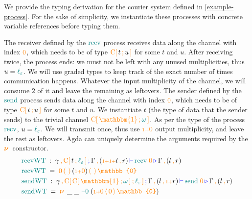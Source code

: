 \documentclass[runningheads]{llncs}
\newcommand{\type}[1]{\textcolor{blue}{\operatorname{#1}}}
\newcommand{\constr}[1]{\textcolor{orange}{\operatorname{#1}}}
\newcommand{\func}[1]{\textcolor{teal}{\operatorname{#1}}}
\newcommand{\PO}{\constr{\mathbb{0}}}
\newcommand{\new}{\constr{\boldsymbol{\nu}} \,}
\newcommand{\send}[2]{#1 \, \constr{\langle} \, #2 \,\constr{\rangle} \,}
\newcommand{\recv}[2]{#1 \, \constr{\mathbb{(}} \, #2 \, \constr{\mathbb{)}} \,}
\newcommand{\suc}{\constr{\scriptstyle 1+}}
\newcommand{\unit}{\constr{\mathbbm{1}}}
\newcommand{\channel}[2]{\constr{C[} \, #1 \, \constr{;} \, #2 \, \constr{]}}
\newcommand{\comma}{\, \constr{,} \,}
\newcommand{\zero}{\func{\cdot-0}}
\newcommand{\lz}{\func{\ell_{\varepsilon}}}
\newcommand{\types}[4]{#1 \, \type{;} \, #2 \, \type{\vdash} \, #3 \, \type{\triangleright} \, #4}
\begin{document}
\begin{example}
\label{example-derivation}
We provide the typing derivation for the courier system defined in \autoref{example-process}.
For the sake of simplicity, we instantiate these processes with concrete variable references before typing them.

The receiver defined by the $\func{recv}$ process receives data along the channel with index $\constr{0}$, which needs to be of type $\channel{t}{u}$ for some $t$ and $u$.
After receiving twice, the process ends: we must not be left with any unused multiplicities, thus $u = \lz$.
We will use graded types to keep track of the exact number of times communication happens.
Whatever the input multiplicity of the channel, we will consume $2$ of it and leave the remaining as leftovers.
The sender defined by the $\func{send}$ process sends data along the channel with index $\constr{0}$, which needs to be of type $\channel{t}{u}$ for some $t$ and $u$.
We instantiate $t$ (the type of data that the sender sends) to the trivial channel $\channel{\unit}{\func{\omega}}$.
As per the type of the process $\func{recv}$, $u = \lz$.
We will transmit once, thus use $\suc{\constr{0}}$ output multiplicity, and leave the rest as leftovers.
Agda can uniquely determine the arguments required by the $\new{}$ constructor.
\begin{align*}
   & \func{recvWT} \;  : \; \types{\gamma \comma \channel{t}{\lz}  }{\Gamma \comma (\suc \suc l \comma r)  }{\func{recv} \; \constr{0}  }{\Gamma \comma (l \comma r)} \\
   & \func{recvWT} \;  = \; \recv{\constr{0}}{} \recv{(\suc \constr{0})}{} \PO \\
   & \func{sendWT} \;  : \; \types{\gamma \comma \channel{\channel{\unit}{\func{\omega}}}{\lz}  }{\Gamma \comma (l \comma \suc r)  }{\func{send} \; \constr{0}  }{\Gamma \comma (l \comma r)}  \\
   & \func{sendWT} \;  = \; \new{} \; \_ \; \_ \; \zero \; (\send{\suc \constr{0}}{\constr{0}} \PO)
\end{align*}


\end{example}
\end{document}

